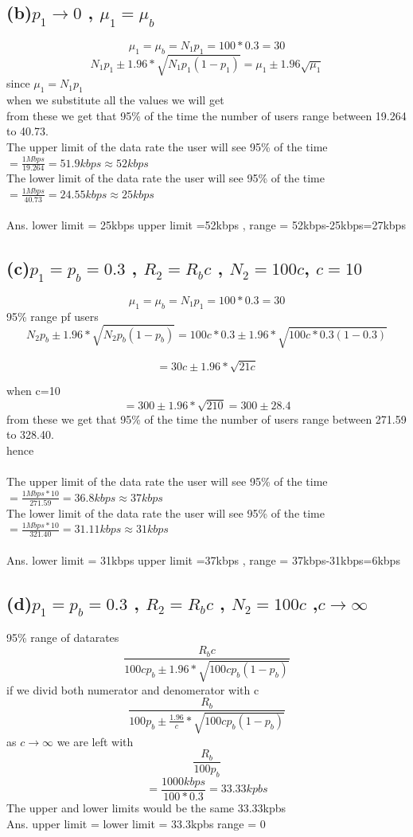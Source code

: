 \documentclass[a4paper,11pt]{article}
\begin{document}
\subsection*{(b)\quad $p_1 \rightarrow 0$ , $\mu_1 = \mu_b$  }
$$\mu_1 =\mu_b= N_1p_1 = 100*0.3=30$$
$$N_1p_1\pm1.96*\sqrt{N_1p_1(1-p_1)} = \mu_1 \pm 1.96 \sqrt{\mu_1} $$ 
since $\mu_1 = N_1p_1$\\ when we substitute all the values we will get \\
from these we get that 95\% of the time the number of users range between 19.264 to 40.73.\\
The upper limit of the data rate the user will see 95\% of the time $= \frac{1Mbps}{19.264}=51.9kbps\approx52kbps$\\
The lower limit of the data rate the user will see 95\% of the time $= \frac{1Mbps}{40.73}=24.55kbps\approx25kbps$\\\\
Ans. lower limit  = 25kbps upper limit =52kbps , range = 52kbps-25kbps=27kbps
\subsection*{(c)\quad $p_1 = p_b=0.3$ , $R_2 = R_bc$ , $N_2 = 100c$, $c=10$ }
$$\mu_1 =\mu_b= N_1p_1 = 100*0.3=30$$
95\% range pf users 
$$N_2p_b\pm1.96*\sqrt{N_2p_b(1-p_b)}=100c*0.3\pm1.96*\sqrt{100c*0.3(1-0.3)} $$ 

$$=30c\pm 1.96*\sqrt{21c} $$ 

when c=10
$$=300\pm 1.96*\sqrt{210} = 300 \pm 28.4 $$ 
from these we get that 95\% of the time the number of users range between 271.59 to 328.40.\\
hence\\\\
The upper limit of the data rate the user will see 95\% of the time $= \frac{1Mbps*10}{271.59}=36.8kbps\approx37kbps$\\
The lower limit of the data rate the user will see 95\% of the time $= \frac{1Mbps*10}{321.40}=31.11kbps\approx31kbps$\\\\
Ans. lower limit  = 31kbps upper limit =37kbps , range = 37kbps-31kbps=6kbps
\subsection*{(d)\quad $p_1 = p_b=0.3$ , $R_2 = R_bc$ , $N_2 = 100c$ ,$c\rightarrow \infty$}
95\% range of datarates\\
$$\frac{R_bc}{100cp_b\pm1.96*\sqrt{100cp_b(1-p_b)}} $$ 
if we divid both numerator and denomerator with c \\
$$\frac{R_b}{100p_b\pm\frac{1.96}{c}*\sqrt{100cp_b(1-p_b)}} $$ 
as $c\rightarrow \infty$ we are left with $$\frac{R_b}{100p_b} $$ 
$$=\frac{1000kbps}{100*0.3}=33.33kpbs$$
The upper and lower limits would be the same 33.33kpbs\\
Ans. upper limit  = lower limit = 33.3kpbs range = 0
\newpage
\end{document}
